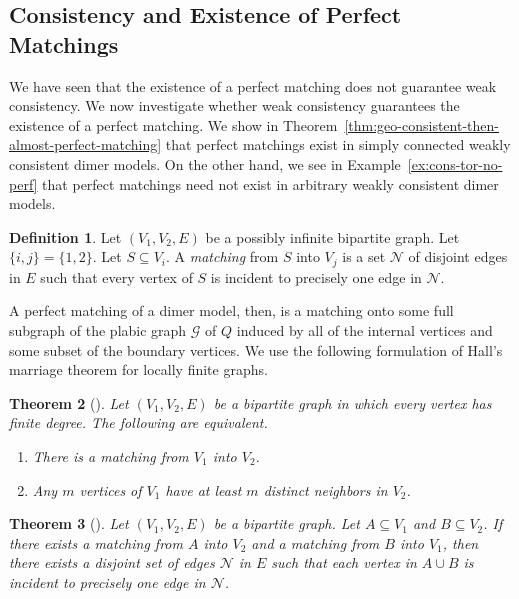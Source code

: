 \documentclass{article}
\newtheorem{thm}{Theorem}[section]
\theoremstyle{definition}
\newtheorem{defn}[thm]{Definition}
\begin{document}
\subsection{Consistency and Existence of Perfect Matchings}

We have seen that the existence of a perfect matching does not guarantee weak consistency. We now investigate whether weak consistency guarantees the existence of a perfect matching.
We show in Theorem~\ref{thm:geo-consistent-then-almost-perfect-matching} that perfect matchings exist in simply connected weakly consistent dimer models. On the other hand, we see in Example~\ref{ex:cons-tor-no-perf} that perfect matchings need not exist in arbitrary weakly consistent dimer models.

\begin{defn}
	Let $(V_1,V_2,E)$ be a possibly infinite bipartite graph. Let $\{i,j\}=\{1,2\}$. Let $S\subseteq V_i$. A \textit{matching} from $S$ into $V_j$ is a set $\mathcal N$ of disjoint edges in $E$ such that every vertex of $S$ is incident to precisely one edge in $\mathcal N$.
\end{defn}

A perfect matching of a dimer model, then, is a matching onto some full subgraph of the plabic graph $\mathcal G$ of $Q$ induced by all of the internal vertices and some subset of the boundary vertices.
We use the following formulation of Hall's marriage theorem for locally finite graphs.

\begin{thm}[{\cite[Theorem 6]{XXClark}}]\label{thm:IBLFHT}
	Let $(V_1,V_2,E)$ be a bipartite graph in which every vertex has finite degree. The following are equivalent.
	\begin{enumerate}
		\item There is a matching from $V_1$ into $V_2$.
		\item Any $m$ vertices of $V_1$ have at least $m$ distinct neighbors in $V_2$.
	\end{enumerate}
\end{thm}

\begin{thm}[{\cite[Theorem 1.1]{AharoniX}}]\label{thm:aharoni}
	Let $(V_1,V_2,E)$ be a bipartite graph. Let $A\subseteq V_1$ and $B\subseteq V_2$. If there exists a matching from $A$ into $V_2$ and a matching from $B$ into $V_1$, then there exists a disjoint set of edges $\mathcal N$ in $E$ such that each vertex in $A\cup B$ is incident to precisely one edge in $\mathcal N$.
\end{thm}
\end{document}
